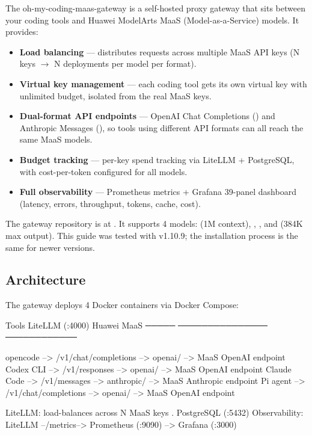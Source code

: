 \documentclass{guide}
\begin{document}
The oh-my-coding-maas-gateway is a self-hosted proxy gateway that sits between
your coding tools and Huawei ModelArts MaaS (Model-as-a-Service) models. It
provides:

\begin{itemize}
  \item \textbf{Load balancing} --- distributes requests across multiple MaaS
        API keys (N keys $\to$ N deployments per model per format).
  \item \textbf{Virtual key management} --- each coding tool gets its own
        virtual key with unlimited budget, isolated from the real MaaS keys.
  \item \textbf{Dual-format API endpoints} --- OpenAI Chat Completions
        () and Anthropic Messages
        (), so tools using different API formats can
        all reach the same MaaS models.
  \item \textbf{Budget tracking} --- per-key spend tracking via LiteLLM +
        PostgreSQL, with cost-per-token configured for all models.
  \item \textbf{Full observability} --- Prometheus metrics + Grafana 39-panel
        dashboard (latency, errors, throughput, tokens, cache, cost).
\end{itemize}

\begin{infobox}
The gateway repository is at
.
It supports 4 models:  (1M context),
, , and
 (384K max output). This guide was tested with
v1.10.9; the installation process is the same for newer versions.
\end{infobox}

\subsection{Architecture}

The gateway deploys 4 Docker containers via Docker Compose:

\begin{code}
  Tools               LiteLLM (:4000)                  Huawei MaaS
  ─────               ───────────────                  ────────────

  opencode    --> /v1/chat/completions --> openai/    --> MaaS OpenAI endpoint
  Codex CLI   --> /v1/responses        --> openai/    --> MaaS OpenAI endpoint
  Claude Code --> /v1/messages         --> anthropic/ --> MaaS Anthropic endpoint
  Pi agent    --> /v1/chat/completions --> openai/    --> MaaS OpenAI endpoint

  LiteLLM: load-balances across N MaaS keys . PostgreSQL (:5432)
  Observability: LiteLLM --/metrics--> Prometheus (:9090) --> Grafana (:3000)
\end{code}
\end{document}
